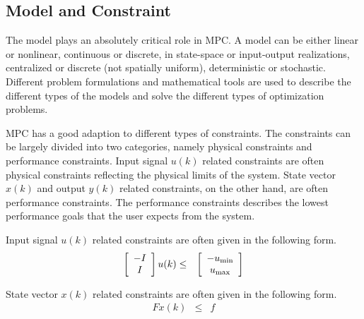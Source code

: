 \subsection{Model and Constraint}

The model plays an absolutely critical role in MPC. A model can be either linear or nonlinear, continuous or discrete, in state-space or input-output realizations, centralized or discrete (not spatially uniform), deterministic or stochastic. Different problem formulations and mathematical tools are used to describe the different types of the models and solve the different types of optimization problems.

MPC has a good adaption to different types of constraints. The constraints can be largely divided into two categories, namely physical constraints and performance constraints. Input signal $u(k)$ related constraints are often physical constraints reflecting the physical limits of the system. State vector $x(k)$ and output $y(k)$ related constraints, on the other hand, are often performance constraints. The performance constraints describes the lowest performance goals that the user expects from the system.

Input signal $u(k)$ related constraints are often given in the following form.
\begin{eqnarray}
	\left[\begin{array}{c}
		-I \\ I
	\end{array}\right]u(k) &\leq& \left[\begin{array}{c}
	-u_{\textup{min}} \\ u_{\textup{max}}
\end{array}\right] \label{eq:mpcconstraintu}
\end{eqnarray}

State vector $x(k)$ related constraints are often given in the following form.
\begin{eqnarray}
	Fx(k) &\leq& f \label{eq:mpcconstraintx}
\end{eqnarray}

